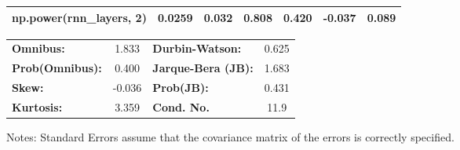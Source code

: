 \begin{center}
\begin{tabular}{lcccccc}
\textbf{np.power(rnn\_layers, 2)}         &       0.0259  &        0.032     &     0.808  &         0.420        &       -0.037    &        0.089     \\
\bottomrule
\end{tabular}
\begin{tabular}{lclc}
\textbf{Omnibus:}       &  1.833 & \textbf{  Durbin-Watson:     } &    0.625  \\
\textbf{Prob(Omnibus):} &  0.400 & \textbf{  Jarque-Bera (JB):  } &    1.683  \\
\textbf{Skew:}          & -0.036 & \textbf{  Prob(JB):          } &    0.431  \\
\textbf{Kurtosis:}      &  3.359 & \textbf{  Cond. No.          } &     11.9  \\
\bottomrule
\end{tabular}
\end{center}

Notes: \newline
 [1] Standard Errors assume that the covariance matrix of the errors is correctly specified.